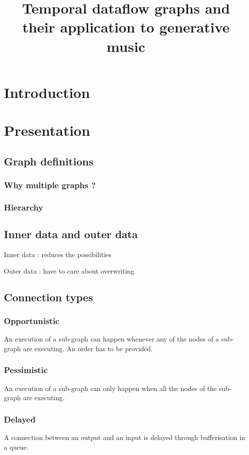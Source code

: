 \documentclass[a4paper,twocolumns]{article}
\title{Temporal dataflow graphs and their application to generative music}
\begin{document}
	\maketitle
	
	\section{Introduction}
	\section{Presentation}
	\subsection{Graph definitions}
	\subsubsection{Why multiple graphs ?}
	\subsubsection{Hierarchy}
	
	\subsection{Inner data and outer data}
	Inner data : reduces the possibilities
	
	Outer data : have to care about overwriting
	
	\subsection{Connection types}
	\subsubsection{Opportunistic}
	An execution of a sub-graph can happen whenever any of the nodes of a sub-graph are executing. 
	An order has to be provided.
	\subsubsection{Pessimistic}
	An execution of a sub-graph can only happen when all the nodes of the sub-graph are executing.
	\subsubsection{Delayed}
	A connection between an output and an input is delayed through bufferisation in a queue.
	
\end{document}
